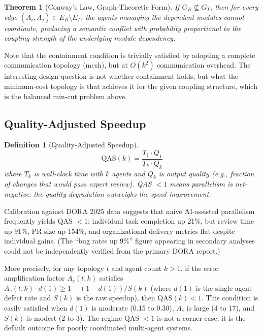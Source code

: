 \documentclass[11pt, a4paper]{googledeepmind}
\newtheorem{definition}{Definition}[section]
\newtheorem{theorem}{Theorem}[section]
\begin{document}
\begin{theorem}[Conway's Law, Graph-Theoretic Form]
\label{thm:conway}
If $G_R \not\subseteq G_T$, then for every edge $(A_i, A_j) \in E_R \setminus E_T$, the agents managing the dependent modules cannot coordinate, producing a semantic conflict with probability proportional to the coupling strength of the underlying module dependency.
\end{theorem}

Note that the containment condition is trivially satisfied by adopting a complete communication topology (mesh), but at $O(k^2)$ communication overhead. The interesting design question is not whether containment holds, but what the minimum-cost topology is that achieves it for the given coupling structure, which is the balanced min-cut problem above.

\subsection{Quality-Adjusted Speedup}

\begin{definition}[Quality-Adjusted Speedup]
\label{def:qas}
\begin{equation}
    \text{QAS}(k) = \frac{T_1 \cdot Q_1}{T_k \cdot Q_k}
\end{equation}
where $T_k$ is wall-clock time with $k$ agents and $Q_k$ is output quality (e.g., fraction of changes that would pass expert review). QAS $< 1$ means parallelism is net-negative: the quality degradation outweighs the speed improvement.
\end{definition}

Calibration against DORA 2025 data suggests that naive AI-assisted parallelism frequently yields QAS $< 1$: individual task completion up 21\%, but review time up 91\%, PR size up 154\%, and organizational delivery metrics flat despite individual gains. (The ``bug rates up 9\%'' figure appearing in secondary analyses could not be independently verified from the primary DORA report.)

More precisely, for any topology $t$ and agent count $k > 1$, if the error amplification factor $A_e(t,k)$ satisfies $A_e(t, k) \cdot d(1) \geq 1 - (1 - d(1))/S(k)$ (where $d(1)$ is the single-agent defect rate and $S(k)$ is the raw speedup), then QAS$(k) < 1$. This condition is easily satisfied when $d(1)$ is moderate (0.15 to 0.30), $A_e$ is large (4 to 17), and $S(k)$ is modest (2 to 3). The regime QAS $< 1$ is not a corner case; it is the default outcome for poorly coordinated multi-agent systems.
\end{document}
